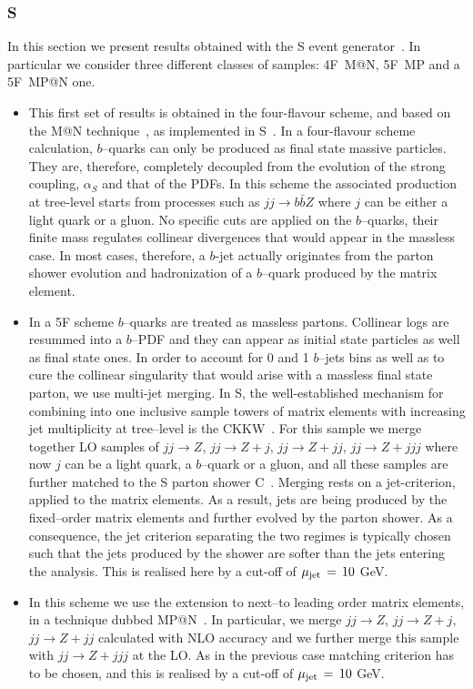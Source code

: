 \documentclass[11pt]{cernrep} \usepackage{graphicx,epsfig} 
\makeatletter
\newcommand{\Sherpa}{S\protect\scalebox{0.8}{HERPA}\xspace}
\newcommand{\CSS}{C\protect\scalebox{0.8}{SS}\xspace}
\newcommand{\MCatNLO}{M\protect\scalebox{0.8}{C}@N\protect\scalebox{0.8}{LO}\xspace}
\newcommand{\MEPS}{M\scalebox{0.8}{E}P\scalebox{0.8}{S}\xspace}
\newcommand{\MEPSatNLO}{M\scalebox{0.8}{E}P\scalebox{0.8}{S}@N\protect\scalebox{0.8}{LO}\xspace}
\makeatother
\begin{document}
\subsubsection{\protect\Sherpa }
In this section we present results obtained with the \Sherpa event generator~\cite{Gleisberg:2008ta}. In particular we consider three different classes of samples: 4F~\MCatNLO, 5F~\MEPS and a 5F~\MEPSatNLO one.
\begin{itemize}
\item[4F \MCatNLO : ]{
	This first set of results is obtained in the four-flavour scheme, and based
	on the \MCatNLO technique~\cite{Frixione:2002ik}, as implemented in
  	\Sherpa~\cite{Hoeche:2011fd}. In a four-flavour scheme calculation, $b$--quarks
	can only be produced as final state massive particles. They are, therefore, 
	completely decoupled from the evolution of the strong coupling, $\alpha_S$
	and that of the PDFs. In this scheme the associated production at tree-level
	starts from processes such as $jj \to b\bar{b}Z$ where $j$ can be either a light
	quark or a gluon. No specific cuts are applied on the $b$--quarks, their finite
 	mass regulates collinear divergences that would appear in
  	the massless case. In most cases, therefore, a $b$-jet actually
 	originates from the parton shower evolution and hadronization of a
  	$b$--quark produced by the matrix element.}
\item[5F~\MEPS :]{
	In a 5F scheme $b$--quarks are treated as massless partons. Collinear 
	logs are resummed into a $b$--PDF and they can appear as initial state 
	particles as well as final state ones. In order to account for 0 and 1 $b$--jets
	bins as well as to cure the collinear singularity that would arise with a 
	massless final state parton, we use multi-jet merging. In \Sherpa, the well-established mechanism for
        combining into one inclusive sample towers of  
	matrix elements with increasing jet multiplicity at tree--\-level is the CKKW~\cite{Catani:2001cc}.
	For this sample we merge together LO samples of $jj \to Z$, $jj \to Z+j$,
	$jj \to Z+jj$,  $jj \to Z+jjj$ where now $j$ can be a light quark, a $b$--quark or a  		
        gluon, and all these samples are further matched to the \Sherpa 
	parton shower \CSS~\cite{Schumann:2007mg}. 
	Merging rests on a jet-criterion, applied to the matrix
  	elements.  As a result, jets are being produced by the fixed--order
  	matrix elements and further evolved by the parton shower.  As a consequence,
  	the jet criterion separating the two regimes is typically chosen such
  	that the jets produced by the shower are softer than the jets
  	entering the analysis.  This is realised here by a cut-off of
  	$\mu_{\rm jet}\,=\, 10 $ GeV.}
	
\item[5F~\MEPSatNLO : ]{
	In this scheme we use the extension to next--to leading order matrix elements, in
  	a technique dubbed \MEPSatNLO~\cite{Hoeche:2012yf}.
	In particular, we merge $jj \to Z$, $jj \to Z+j$, $jj \to Z+jj$ calculated with NLO
	accuracy and we further merge this sample with $jj \to Z+jjj$ at the LO.
	As in the previous case matching criterion has to be chosen, and this is 
	realised by a cut-off of  $\mu_{\rm jet}\,=\, 10 $ GeV.}
\end{itemize}
\end{document}
